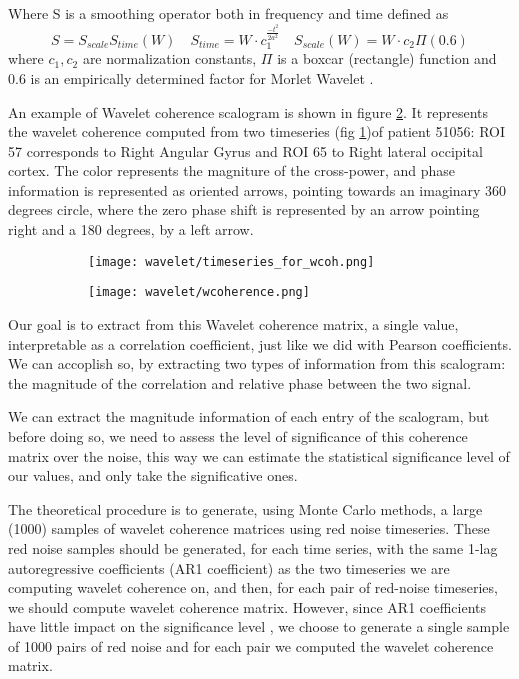 \documentclass[a4paper,11pt]{article}
\begin{document}
Where S is a smoothing operator both in frequency and time defined as \cite{torrence-1999} \cite{grinsted-2004}
\[
S = S_{scale}S_{time}(W) \quad S_{time} = W\cdot c_1 ^{\frac{-t^2}{2a^2}} \quad S_{scale}(W) = W\cdot c_2 \Pi(0.6)
\]
where $c_1, c_2$ are normalization constants, $\Pi$ is a boxcar (rectangle) function and 0.6 is an empirically determined factor for Morlet Wavelet \cite{torrence-1998}.

An example of Wavelet coherence scalogram is shown in figure \ref{fig:wcoherence_scalogram}. It represents the wavelet coherence computed from two timeseries (fig \ref{fig:wcoherence_timeseries})of patient 51056: ROI 57 corresponds to Right Angular Gyrus and ROI 65 to Right lateral occipital cortex.
The color represents the magniture of the cross-power, and phase information is represented as oriented arrows, pointing towards an imaginary 360 degrees circle, where the zero phase shift is represented by an arrow pointing right and a 180 degrees, by a left arrow.



\begin{figure}
\begin{subfigure}{0.5\textwidth}
\texttt{[image: wavelet/timeseries\_for\_wcoh.png]}
\caption{}
\label{fig:wcoherence_timeseries}
\end{subfigure}
\begin{subfigure}{0.5\textwidth}
\texttt{[image: wavelet/wcoherence.png]}
\caption{}
\label{fig:wcoherence_scalogram}
\end{subfigure}
\caption{}
\label{fig:wcoherence}
\end{figure}



Our goal is to extract from this Wavelet coherence matrix, a single value, interpretable as a correlation coefficient, just like we did with Pearson coefficients.
We can accoplish so, by extracting two types of information from this scalogram: the magnitude of the correlation and relative phase between the two signal.


We can extract the magnitude information of each entry of the scalogram, but before doing so, we need to assess the level of significance of this coherence matrix over the noise, this way we can estimate the statistical significance level of our values, and only take the significative ones.

The theoretical procedure \cite{grinsted-2004} \cite{bernas-2018} is to generate, using Monte Carlo methods, a large (1000) samples of wavelet coherence matrices using red noise timeseries.
These red noise samples should be generated, for each time series, with the same 1-lag autoregressive coefficients (AR1 coefficient) as the two timeseries we are computing wavelet coherence on, and then, for each pair of red-noise timeseries, we should compute wavelet coherence matrix.
However, since AR1 coefficients have little impact on the significance level \cite{grinsted-2004}, we choose to generate a single sample of 1000 pairs of red noise and for each pair we computed the wavelet coherence matrix.
\end{document}
